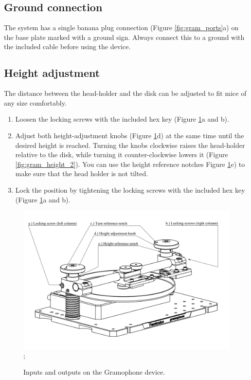\documentclass[11pt,a4paper]{article}
\begin{document}
\subsection{Ground connection}
The system has a single banana plug connection (Figure \ref{fig:gram_ports}a) on the base plate marked with a ground sign. Always connect this to a ground with the included cable before using the device.

\subsection{Height adjustment \label{sec:height_adjust}}
The distance between the head-holder and the disk can be adjusted to fit mice of any size comfortably.
\begin{enumerate}
\item Loosen the locking screws with the included hex key (Figure \ref{fig:gram_height_1}a and b).
\item Adjust both height-adjustment knobs (Figure \ref{fig:gram_height_1}d) at the same time until the desired height is reached. Turning the knobs clockwise raises the head-holder relative to the disk, while turning it counter-clockwise lowers it (Figure \ref{fig:gram_height_2}). You can use the height reference notches Figure \ref{fig:gram_height_1}e) to make sure that the head holder is not tilted.
\item Lock the position by tightening the locking screws with the included hex key (Figure \ref{fig:gram_height_1}a and b).
\end{enumerate}

\begin{figure}[H] %
\centering
\includegraphics[clip, trim=0cm 0cm 0cm 1cm, width=1.00\textwidth]{labels_height_1.PDF};
\caption{Inputs and outputs on the Gramophone device.}
\label{fig:gram_height_1}
\end{figure}
\end{document}
